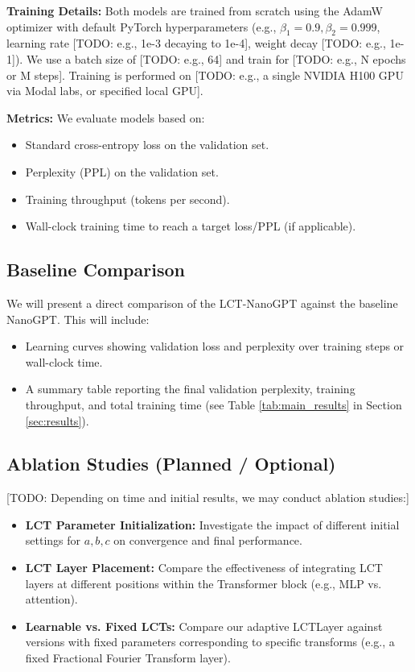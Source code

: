 \textbf{Training Details:} Both models are trained from scratch using the AdamW optimizer \citep{loshchilov2017decoupled} with default PyTorch hyperparameters (e.g., \(\beta_1=0.9, \beta_2=0.999\), learning rate [TODO: e.g., 1e-3 decaying to 1e-4], weight decay [TODO: e.g., 1e-1]). We use a batch size of [TODO: e.g., 64] and train for [TODO: e.g., N epochs or M steps]. Training is performed on [TODO: e.g., a single NVIDIA H100 GPU via Modal labs, or specified local GPU].

\textbf{Metrics:} We evaluate models based on:
\begin{itemize}
  \item Standard cross-entropy loss on the validation set.
  \item Perplexity (PPL) on the validation set.
  \item Training throughput (tokens per second).
  \item Wall-clock training time to reach a target loss/PPL (if applicable).
\end{itemize}

\subsection{Baseline Comparison}
We will present a direct comparison of the LCT-NanoGPT against the baseline NanoGPT. This will include:
\begin{itemize}
  \item Learning curves showing validation loss and perplexity over training steps or wall-clock time.
  \item A summary table reporting the final validation perplexity, training throughput, and total training time (see Table \ref{tab:main_results} in Section \ref{sec:results}).
\end{itemize}

\subsection{Ablation Studies (Planned / Optional)}
[TODO: Depending on time and initial results, we may conduct ablation studies:]
\begin{itemize}
  \item \textbf{LCT Parameter Initialization:} Investigate the impact of different initial settings for \(a,b,c\) on convergence and final performance.
  \item \textbf{LCT Layer Placement:} Compare the effectiveness of integrating LCT layers at different positions within the Transformer block (e.g., MLP vs. attention).
  \item \textbf{Learnable vs. Fixed LCTs:} Compare our adaptive LCTLayer against versions with fixed parameters corresponding to specific transforms (e.g., a fixed Fractional Fourier Transform layer).
\end{itemize}